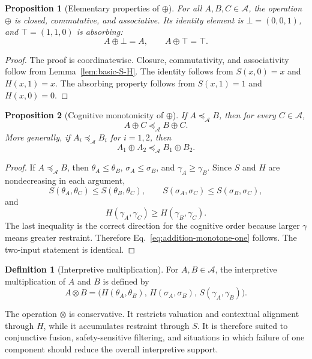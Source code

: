 \documentclass[reqno,final]{amsart}
\theoremstyle{definition}
\newtheorem{definition}{Definition}
\theoremstyle{plain}
\newtheorem{proposition}{Proposition}
\theoremstyle{remark}
\providecommand{\cA}{\mathcal{A}}
\providecommand{\preceqA}{\preceq_{\mathcal A}}
\begin{document}
\begin{proposition}[Elementary properties of \(\oplus\)]
\label{prop:addition-properties}
For all \(A,B,C\in\cA\), the operation \(\oplus\) is closed, commutative, and associative. Its identity element is \(\bot=(0,0,1)\), and \(\top=(1,1,0)\) is absorbing:
\[
A\oplus\bot=A,\qquad A\oplus\top=\top.
\]
\end{proposition}

\begin{proof}
The proof is coordinatewise. Closure, commutativity, and associativity follow from Lemma~\ref{lem:basic-S-H}. The identity follows from \(S(x,0)=x\) and \(H(x,1)=x\). The absorbing property follows from \(S(x,1)=1\) and \(H(x,0)=0\).
\end{proof}

\begin{proposition}[Cognitive monotonicity of \(\oplus\)]
\label{prop:addition-monotonicity}
If \(A\preceqA B\), then for every \(C\in\cA\),
\begin{equation}
A\oplus C\preceqA B\oplus C.
\label{eq:addition-monotone-one}
\end{equation}
More generally, if \(A_i\preceqA B_i\) for \(i=1,2\), then
\[
A_1\oplus A_2\preceqA B_1\oplus B_2.
\]
\end{proposition}

\begin{proof}
If \(A\preceqA B\), then \(\theta_A\le\theta_B\), \(\sigma_A\le\sigma_B\), and \(\gamma_A\ge\gamma_B\). Since \(S\) and \(H\) are nondecreasing in each argument,
\[
S(\theta_A,\theta_C)\le S(\theta_B,\theta_C),\qquad
S(\sigma_A,\sigma_C)\le S(\sigma_B,\sigma_C),
\]
and
\[
H(\gamma_A,\gamma_C)\ge H(\gamma_B,\gamma_C).
\]
The last inequality is the correct direction for the cognitive order because larger \(\gamma\) means greater restraint. Therefore Eq.~\eqref{eq:addition-monotone-one} follows. The two-input statement is identical.
\end{proof}

\begin{definition}[Interpretive multiplication]
\label{def:interpretive-multiplication}
For \(A,B\in\cA\), the interpretive multiplication of \(A\) and \(B\) is defined by
\[
A\otimes B
=
\big(H(\theta_A,\theta_B),\,H(\sigma_A,\sigma_B),\,S(\gamma_A,\gamma_B)\big).
\]
\end{definition}

The operation \(\otimes\) is conservative. It restricts valuation and contextual alignment through \(H\), while it accumulates restraint through \(S\). It is therefore suited to conjunctive fusion, safety-sensitive filtering, and situations in which failure of one component should reduce the overall interpretive support.
\end{document}
